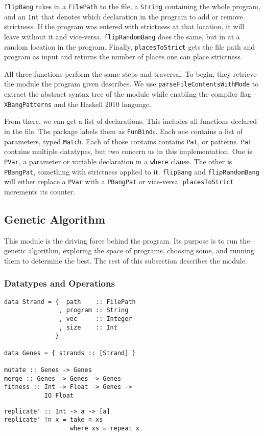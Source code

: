 \documentclass{sigplanconf}
\begin{document}
\lstinline!flipBang! takes in a \lstinline!FilePath! to the file, a \lstinline!String! containing the whole program, and an \lstinline!Int! that denotes which declaration in the program to add or remove strictness. If the program was entered with strictness at that location, it will leave without it and vice-versa. \lstinline!flipRandomBang! does the same, but in at a random location in the program. Finally, \lstinline!placesToStrict! gets the file path and program as input and returns the number of places one can place strictness.

All three functions perform the same steps and traversal. To begin, they retrieve the module the program given describes. We use \lstinline!parseFileContentsWithMode! to extract the abstract syntax tree of the module while enabling the compiler flag \lstinline!-XBangPatterns! and the Haskell 2010 language. 

From there, we can get a list of declarations. This includes all functions declared in the file. The package labels them as \lstinline!FunBind!s. Each one contains a list of parameters, typed \lstinline!Match!. Each of those contains contains \lstinline!Pat!, or patterns. \lstinline!Pat! contains multiple datatypes, but two concern us in this implementation. One is \lstinline!PVar!, a parameter or variable declaration in a \lstinline!where! clause. The other is \lstinline!PBangPat!, something with strictness applied to it. \lstinline!flipBang! and \lstinline!flipRandomBang! will either replace a \lstinline!PVar! with a \lstinline!PBangPat! or vice-versa. \lstinline!placesToStrict! increments its counter.

\subsection{Genetic Algorithm}
This module is the driving force behind the program. Its purpose is to run the genetic algorithm, exploring the space of programs, choosing some, and running them to determine the best. The rest of this subsection describes the module.
\subsubsection{Datatypes and Operations}
\begin{lstlisting}[float,caption=Datatypes and operations in Genetic module,label={lst:genetic},frame=single]
data Strand = {  path    :: FilePath
               , program :: String
               , vec     :: Integer
               , size    :: Int
              }

data Genes = { strands :: [Strand] }

mutate :: Genes -> Genes
merge :: Genes -> Genes -> Genes
fitness :: Int -> Float -> Genes -> 
           IO Float
\end{lstlisting}
\begin{lstlisting}[float,caption=Example program,label={lst:example},frame=single]
replicate' :: Int -> a -> [a]
replicate' !n x = take n xs
                  where xs = repeat x
\end{lstlisting}
\end{document}
